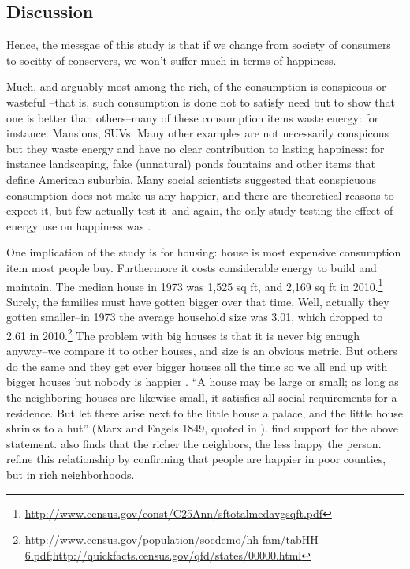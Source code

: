 \documentclass[10pt, letterpaper]{article}
\begin{document}
\begin{spacing}{1.4}
\section{Discussion}


Hence, the messgae of this study is that if we change from society of consumers
to socitty of conservers, we won't suffer much in terms of happiness.

Much, and  arguably most among the rich, of the consumption is conspicous or
wasteful \citep{veblen05a, veblen05b}--that is, such consumption is done not to satisfy need but to show that
one is better than others--many of these consumption items waste energy: for
instance: Mansions, SUVs.  Many other examples are not necessarily conspicous
but they waste energy and have no clear contribution to lasting happiness: for
instance landscaping, fake (unnatural) ponds fountains and other items that
define American suburbia. Many social scientists \citep[e.g.][]{csikszentmihalyi99, frank04, frank05, frank12} suggested that conspicuous consumption
does not make us any happier, and there are theoretical reasons to
expect it, but few actually test it--and again, the only  study testing the
effect of energy use on happiness was \citet{graef81}.

One implication of the study is for housing: house is most expensive consumption
item most people buy. Furthermore it costs considerable energy to build and
maintain. The median house in 1973 was 1,525 sq ft, and 2,169  sq ft in 2010.\footnote{\url{http://www.census.gov/const/C25Ann/sftotalmedavgsqft.pdf}}
Surely, the families must have gotten bigger over that time. Well,
actually they gotten smaller--in 1973 the average household size was
3.01, which dropped to 2.61 in
2010.\footnote{\url{http://www.census.gov/population/socdemo/hh-fam/tabHH-6.pdf};\url{http://quickfacts.census.gov/qfd/states/00000.html}}
The problem with big houses is that it is never big enough anyway--we
compare it to other houses, and size is an obvious metric. But others
do the same and they get ever bigger houses all the time so we all end
up with bigger houses but nobody is happier \citep{frank12}. ``A house may be large or small; as long as the neighboring houses are
likewise small, it satisfies all social requirements for a
residence. But let there arise next to the little house a palace, and
the little house shrinks to a hut'' (Marx and Engels 1849, quoted in
\citet{dittmann10}). \citet{dittmann10} find support for the above
statement. \citet{luttmer05} also finds that the richer the neighbors,
the less happy the person.
\citet{firebaugh09} refine this relationship by confirming that people
are happier in poor counties, but in  rich neighborhoods. 


\end{spacing}
\end{document}
